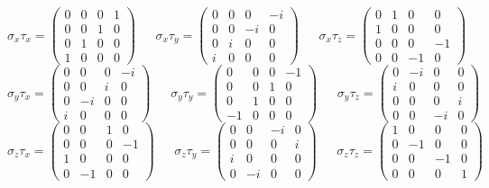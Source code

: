 \documentclass[12pt]{extarticle}
\begin{document}
\begin{equation*}
\sigma_x\tau_x=
\begin{pmatrix}
    0 & 0 & 0 & 1 \\
    0 & 0 & 1 & 0 \\
    0 & 1 & 0 & 0 \\
    1 & 0 & 0 & 0
\end{pmatrix}
~~~~~~~\sigma_x\tau_y=
\begin{pmatrix}
    0 & 0 & 0 & -i \\
    0 & 0 & -i & 0 \\
    0 & i & 0 & 0 \\
    i & 0 & 0 & 0
\end{pmatrix}
~~~~~~~\sigma_x\tau_z=
\begin{pmatrix}
    0 & 1 & 0 & 0 \\
    1 & 0 & 0 & 0 \\
    0 & 0 & 0 & -1 \\
    0 & 0 & -1 & 0
\end{pmatrix}
\end{equation*}
\begin{equation*}
\sigma_y\tau_x=
\begin{pmatrix}
    0 & 0 & 0 & -i \\
    0 & 0 & i & 0 \\
    0 & -i & 0 & 0 \\
    i & 0 & 0 & 0
\end{pmatrix}
~~~~~~~\sigma_y\tau_y=
\begin{pmatrix}
    0 & 0 & 0 & -1 \\
    0 & 0 & 1 & 0 \\
    0 & 1 & 0 & 0 \\
    -1 & 0 & 0 & 0
\end{pmatrix}
~~~~~~~\sigma_y\tau_z=
\begin{pmatrix}
    0 & -i & 0 & 0 \\
    i & 0 & 0 & 0 \\
    0 & 0 & 0 & i \\
    0 & 0 & -i & 0
\end{pmatrix}
\end{equation*}
\begin{equation*}
\sigma_z\tau_x=
\begin{pmatrix}
    0 & 0 & 1 & 0 \\
    0 & 0 & 0 & -1 \\
    1 & 0 & 0 & 0 \\
    0 & -1 & 0 & 0
\end{pmatrix}
~~~~~~~\sigma_z\tau_y=
\begin{pmatrix}
    0 & 0 & -i & 0 \\
    0 & 0 & 0 & i \\
    i & 0 & 0 & 0 \\
    0 & -i & 0 & 0
\end{pmatrix}
~~~~~~~\sigma_z\tau_z=
\begin{pmatrix}
    1 & 0 & 0 & 0 \\
    0 & -1 & 0 & 0 \\
    0 & 0 & -1 & 0 \\
    0 & 0 & 0 & 1
\end{pmatrix}
\end{equation*}
\end{document}
